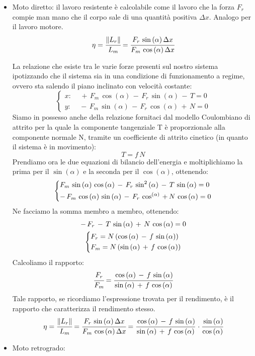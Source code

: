 \begin{itemize}
\item Moto diretto: il lavoro resistente è calcolabile come il lavoro che la forza $F_r$ compie man mano che il corpo sale di una quantità positiva $\Delta x$. Analogo per il lavoro motore.
\[\eta = \cfrac{\lVert L_r\rVert}{L_m} = \cfrac{F_r\,\sin{(\alpha)}\,\Delta x}{F_m\,\cos{(\alpha)}\,\Delta x}\]

La relazione che esiste tra le varie forze presenti sul nostro sistema ipotizzando che il sistema sia in una condizione di funzionamento a regime, ovvero sta salendo il piano inclinato con velocità costante:
\[
\begin{cases}
x:\quad\,+\,F_m\,\cos{(\alpha)}\,-\,F_r\,\sin{(\alpha)}\,-\,T = 0\\
y:\quad\,-\,F_m\,\sin{(\alpha)}\,-\,F_r\,\cos{(\alpha)}\,+\,N = 0
\end{cases}
\]
Siamo in possesso anche della relazione fornitaci dal modello Coulombiano di attrito per la quale la componente tangenziale T è proporzionale alla componente normale N, tramite un coefficiente di attrito cinetico (in quanto il sistema è in movimento):
\[T = f\,N\]
Prendiamo ora le due equazioni di bilancio dell'energia e moltiplichiamo la prima per il $\sin{(\alpha)}$ e la seconda per il $\cos{(\alpha)}$, ottenendo:
\[
\begin{dcases}
F_m\,\sin{(\alpha)}\,\cos{(\alpha)}\,-\,F_r\,\sin^2{(\alpha)}\,-\,T\,\sin{(\alpha)}=0\\
-\,F_m\,\cos{(\alpha)}\,\sin{(\alpha)}\,-\,F_r\,\cos^{(\alpha)}\,+\,N\,\cos{(\alpha)} = 0
\end{dcases}
\]
Ne facciamo la somma membro a membro, ottenendo:
\begin{gather*}
-\,F_r\,-\,T\,\sin{(\alpha)}\,+\,N\,\cos{(\alpha)} = 0\\
\begin{dcases}
F_r = N\,(\cos{(\alpha)}\,-\,f\,\sin{(\alpha)})\\
F_m = N\,(\sin{(\alpha)}\,+\,f\,\cos{(\alpha)})
\end{dcases}
\end{gather*}
Calcoliamo il rapporto:
\[\cfrac{F_r}{F_m} = \cfrac{\cos{(\alpha)}\,-\,f\,\sin{(\alpha)}}{\sin{(\alpha)}\,+\,f\,\cos{(\alpha)}}\]
Tale rapporto, se ricordiamo l'espressione trovata per il rendimento, è il rapporto che caratterizza il rendimento stesso.
\[\eta = \cfrac{\lVert L_r\rVert}{L_m} = \cfrac{F_r\,\sin{(\alpha)}\,\Delta x}{F_m\,\cos{(\alpha)}\,\Delta x} = \cfrac{\cos{(\alpha)}\,-\,f\,\sin{(\alpha)}}{\sin{(\alpha)}\,+\,f\,\cos{(\alpha)}}\,\cdot\cfrac{\sin{(\alpha)}}{\cos{(\alpha)}} \]
\item Moto retrogrado: 


\end{itemize}

